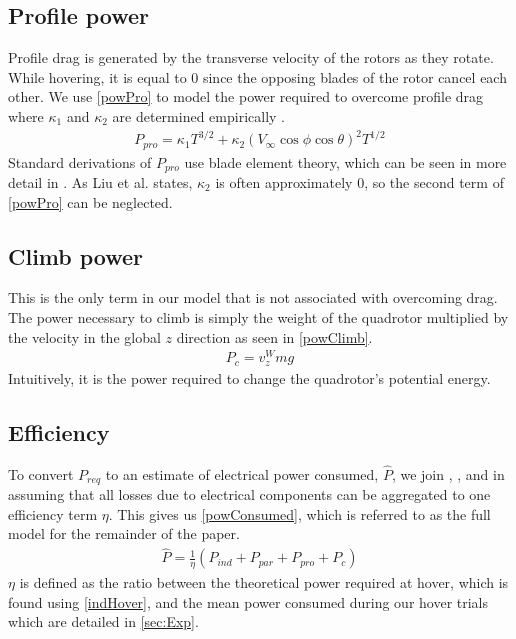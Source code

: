 \subsection{Profile power}
Profile drag is generated by the transverse velocity of the rotors as they rotate. While hovering, it is equal to $0$ since the opposing blades of the rotor cancel each other. We use \eqref{powPro} to model the power required to overcome profile drag where $\kappa_1$ and $\kappa_2$ are determined empirically \cite{bangura2012nonlinear,liu2017power}.
\begin{align}
	\label{powPro}
	P_{pro} = \kappa_1 T^{3/2} + \kappa_2 \left(V_\infty \cos \phi \cos \theta \right)^2 T^{1/2}
\end{align}
Standard derivations of $P_{pro}$ use blade element theory, which can be seen in more detail in \cite{liu2017power}. As Liu et al. states, $\kappa_2$ is often approximately $0$, so the second term of \eqref{powPro} can be neglected.

\subsection{Climb power}
This is the only term in our model that is not associated with overcoming drag. The power necessary to climb is simply the weight of the quadrotor multiplied by the velocity in the global $z$ direction as seen in \eqref{powClimb}. 
\begin{align}
	\label{powClimb}
	P_{c} = v_z^W m g
\end{align}
Intuitively, it is the power required to change the quadrotor's potential energy.

\subsection{Efficiency}
To convert $P_{req}$ to an estimate of electrical power consumed, $\hat{P}$, we join \cite{ware2016analysis}, \cite{kreciglowa2017energy}, and \cite{tagliabue2019model} in assuming that all losses due to electrical components can be aggregated to one efficiency term $\eta$. This gives us \eqref{powConsumed}, which is referred to as the full model for the remainder of the paper.
\begin{align}
	\label{powConsumed}
    \hat{P} = \frac{1}{\eta} \left(P_{ind} + P_{par} + P_{pro} + P_{c} \right)
\end{align}
$\eta$ is defined as the ratio between the theoretical power required at hover, which is found using \eqref{indHover}, and the mean power consumed during our hover trials which are detailed in \ref{sec:Exp}.